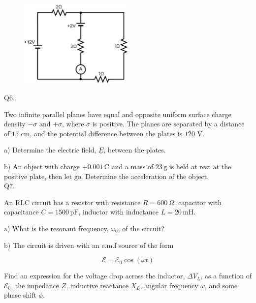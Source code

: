 \documentclass[a4paper,11pt]{article}
\begin{document}
\begin{figure}[h!]
    \centering
    \includegraphics[width=0.5\textwidth]{EMq5figure.PNG}
    \caption*{}
\end{figure}

\noindent Q6. 

\noindent Two infinite parallel planes have equal and opposite uniform surface charge density \( -\sigma \) and \( +\sigma \), where \( \sigma \) is positive. The planes are separated by a distance of \( 15 \) cm, and the potential difference between the plates is \( 120 \) V.  

\medskip

\noindent a) Determine the electric field, \( \underline{E} \), between the plates.

\medskip

\noindent b) An object with charge \( +0.001 \, \text{C} \) and a mass of \( 23 \, \text{g} \) is held at rest at the positive plate, then let go. Determine the acceleration of the object. \\

\noindent Q7. 

\noindent An RLC circuit has a resistor with resistance \( R = 600 \, \Omega \), capacitor with capacitance \( C = 1500 \, \text{pF} \), inductor with inductance \( L = 20 \, \text{mH} \).

\medskip

\noindent a) What is the resonant frequency, \( \omega_{0} \), of the circuit?

\medskip

\noindent b) The circuit is driven with an e.m.f source of the form 

\[ \mathcal{E} = \mathcal{E}_{0} \cos(\omega t) \]

\noindent Find an expression for the voltage drop across the inductor, \( \Delta V_{L} \), as a function of \( \mathcal{E}_{0} \), the impedance \( Z \), inductive reactance \( X_{L} \), angular frequency \( \omega \), and some phase shift \( \phi \).
\end{document}
